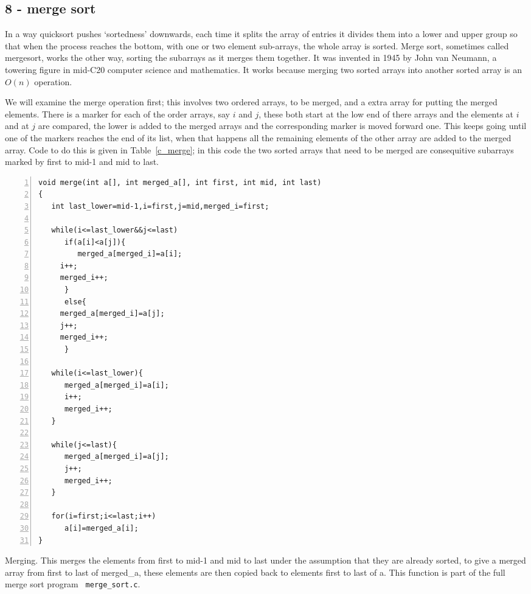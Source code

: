 \documentclass[11pt,a4paper]{scrartcl}
\begin{document}
\subsection*{8 - merge sort}

In a way quicksort pushes \lq{}sortedness\rq{} downwards, each time it
splits the array of entries it divides them into a lower and upper
group so that when the process reaches the bottom, with one or two
element sub-arrays, the whole array is sorted. Merge sort, sometimes
called mergesort, works the other way, sorting the subarrays as it
merges them together. It was invented in 1945 by John van Neumann, a towering
figure in mid-C20 computer science and mathematics. It works because
merging two sorted arrays into another sorted array is an $O(n)$
operation.

We will examine the merge operation first; this involves two ordered
arrays, to be merged, and a extra array for putting the merged
elements. There is a marker for each of the order arrays, say $i$ and
$j$, these both start at the low end of there arrays and the elements
at $i$ and at $j$ are compared, the lower is added to the merged
arrays and the corresponding marker is moved forward one. This keeps
going until one of the markers reaches the end of its list, when that
happens all the remaining elements of the other array are added to the
merged array. Code to do this is given in Table~\ref{c_merge}; in this
code the two sorted arrays that need to be merged are consequitive
subarrays marked by first to mid-1 and mid to last.


\begin{table}
\begin{lstlisting}[numbers=left]
void merge(int a[], int merged_a[], int first, int mid, int last)
{
   int last_lower=mid-1,i=first,j=mid,merged_i=first;

   while(i<=last_lower&&j<=last)
      if(a[i]<a[j]){
         merged_a[merged_i]=a[i];
	 i++;
	 merged_i++;
      }
      else{
	 merged_a[merged_i]=a[j];
	 j++;
	 merged_i++;
      }

   while(i<=last_lower){
      merged_a[merged_i]=a[i];
      i++;
      merged_i++;
   }

   while(j<=last){
      merged_a[merged_i]=a[j];
      j++;
      merged_i++;
   }

   for(i=first;i<=last;i++)
      a[i]=merged_a[i];
}
\end{lstlisting}
\caption{Merging. This merges the elements from first to mid-1 and mid
  to last under the assumption that they are already sorted, to give a
  merged array from first to last of merged\_a, these elements are
  then copied back to elements first to last of a. This function is
  part of the full merge sort program {\tt
    merge\_sort.c}. \label{c_merge}}
\end{table}
\end{document}
